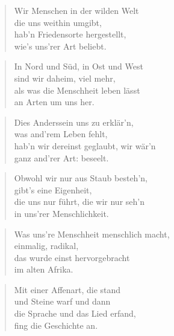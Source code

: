 \documentclass[10pt,a4paper]{article}
\begin{document}
\begin{multicols}{2}
\begin{verse}
Wir Menschen in der wilden Welt \\
die uns weithin umgibt, \\
hab’n Friedensorte hergestellt, \\
wie’s uns’rer Art beliebt. \\
\end{verse}

\begin{verse}
In Nord und Süd, in Ost und West \\
sind wir daheim, viel mehr, \\
als was die Menschheit leben lässt \\
an Arten um uns her. \\
\end{verse}

\begin{verse}
Dies Anderssein uns zu erklär’n, \\
was and’rem Leben fehlt, \\
hab’n wir dereinst geglaubt, wir wär’n \\
ganz and’rer Art: beseelt. \\
\end{verse}

\begin{verse}
Obwohl wir nur aus Staub besteh’n, \\
gibt’s eine Eigenheit, \\
die uns nur führt, die wir nur seh’n \\
in uns’rer Menschlichkeit. \\
\end{verse}

\begin{verse}
Was uns’re Menschheit menschlich macht, \\
einmalig, radikal, \\
das wurde einst hervorgebracht \\
im alten Afrika. \\
\end{verse}

\begin{verse}
Mit einer Affenart, die stand \\
und Steine warf und dann \\
die Sprache und das Lied erfand, \\
fing die Geschichte an. \\
\end{verse}


\end{multicols}
\end{document}
